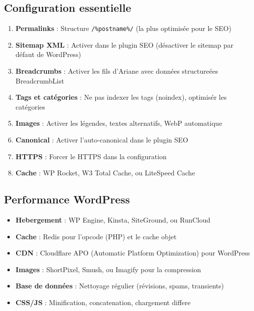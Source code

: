 \documentclass[12pt,a4paper,twoside]{report}
\begin{document}
\subsection{Configuration essentielle}

\begin{enumerate}
    \item \textbf{Permalinks} : Structure \texttt{/\%postname\%/} (la plus optimisée pour le SEO)
    \item \textbf{Sitemap XML} : Activer dans le plugin SEO (désactiver le sitemap par défaut de WordPress)
    \item \textbf{Breadcrumbs} : Activer les fils d'Ariane avec données structureées BreadcrumbList
    \item \textbf{Tags et catégories} : Ne pas indexer les tags (noindex), optimisér les catégories
    \item \textbf{Images} : Activer les légendes, textes alternatifs, WebP automatique
    \item \textbf{Canonical} : Activer l'auto-canonical dans le plugin SEO
    \item \textbf{HTTPS} : Forcer le HTTPS dans la configuration
    \item \textbf{Cache} : WP Rocket, W3 Total Cache, ou LiteSpeed Cache
\end{enumerate}

\subsection{Performance WordPress}

\begin{itemize}
    \item \textbf{Hebergement} : WP Engine, Kinsta, SiteGround, ou RunCloud
    \item \textbf{Cache} : Redis pour l'opcode (PHP) et le cache objet
    \item \textbf{CDN} : Cloudflare APO (Automatic Platform Optimization) pour WordPress
    \item \textbf{Images} : ShortPixel, Smush, ou Imagify pour la compression
    \item \textbf{Base de données} : Nettoyage régulier (révisions, spams, transients)
    \item \textbf{CSS/JS} : Minification, concatenation, chargement differe
\end{itemize}
\end{document}
